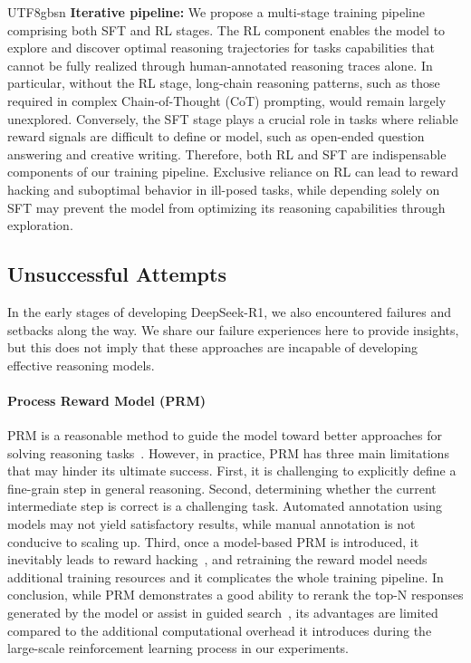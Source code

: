 \documentclass[11pt, a4paper, logo, copyright, nonumbering]{deepseek}
\newcommand{\dsri}{DeepSeek-R1}
\begin{document}
\begin{CJK*}{UTF8}{gbsn}
\textbf{Iterative pipeline:}  We propose a multi-stage training pipeline comprising both SFT and RL stages. The RL component enables the model to explore and discover optimal reasoning trajectories for  tasks capabilities that cannot be fully realized through human-annotated reasoning traces alone. In particular, without the RL stage, long-chain reasoning patterns, such as those required in complex Chain-of-Thought (CoT) prompting, would remain largely unexplored. Conversely, the SFT stage plays a crucial role in tasks where reliable reward signals are difficult to define or model, such as open-ended question answering and creative writing. Therefore, both RL and SFT are indispensable components of our training pipeline. Exclusive reliance on RL can lead to reward hacking and suboptimal behavior in ill-posed tasks, while depending solely on SFT may prevent the model from optimizing its reasoning capabilities through exploration.

\subsection{Unsuccessful Attempts} \label{sec:attempt}
In the early stages of developing \dsri{}, we also encountered failures and setbacks along the way. We share our failure experiences here to provide insights, but this does not imply that these approaches are incapable of developing effective reasoning models.

\paragraph{Process Reward Model (PRM)}
PRM is a reasonable method to guide the model toward better approaches for solving reasoning tasks~\citep{uesato2022solving, lightman2023let,mathshepherd}. However, in practice, PRM has three main limitations that may hinder its ultimate success. First, it is challenging to explicitly define a fine-grain step in general reasoning. 
Second, determining whether the current intermediate step is correct is a challenging task. Automated annotation using models may not yield satisfactory results, while manual annotation is not conducive to scaling up.
Third, once a model-based PRM is introduced, it inevitably leads to reward hacking~\citep{gao2022scalinglawsrewardmodel},  and retraining the reward model needs additional training resources and it complicates the whole training pipeline. In conclusion, while PRM demonstrates a good ability to rerank the top-N responses generated by the model or assist in guided search~\citep{snell2024scalingllmtesttimecompute}, its advantages are limited compared to the additional computational overhead it introduces during the large-scale reinforcement learning process in our experiments.


\end{CJK*}
\end{document}

